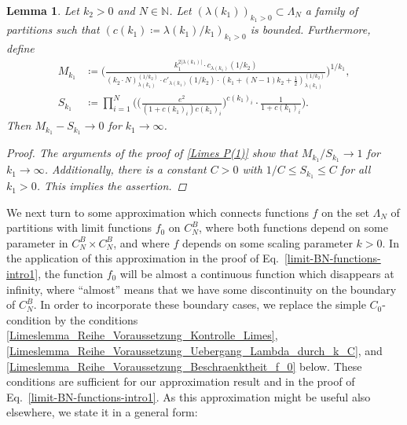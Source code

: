 \documentclass[reqno]{amsart}
\theoremstyle{plain}
\newtheorem{lemma}[theorem]{Lemma}
\theoremstyle{definition}
\numberwithin{equation}{section}
\newcommand{\N}{\mathbb{N}}
\newcommand{\ra}{\rightarrow}
\begin{document}
\begin{lemma}\label{Limes_1_ohne_Jackpolynomanteil}
Let $k_2>0$ and $N\in\N$.
Let $(\lambda(k_1))_{k_1 > 0}\subset\Lambda_N$ a family of partitions such that $(c(k_1)\coloneqq \lambda(k_1)/k_1)_{k_1>0}$ is bounded. 
Furthermore, define
\begin{align*}
M_{k_1} &\coloneqq \Bigg( \frac{k_1^{2|\lambda(k_1)|} \cdot c_{\lambda(k_1)}(1/k_2)}{(k_2 \cdot N)_{\lambda(k_1)}^{(1/k_2)} \cdot c'_{\lambda(k_1)}(1/k_2) \cdot (k_1 + (N-1)k_2 + \frac{1}{2})_{\lambda(k_1)}^{(1/k_2)}} \Bigg)^{1/k_1}, \\
S_{k_1} &\coloneqq \prod\limits_{i=1}^N \Bigg( \bigg( \frac{e^2}{(1+c(k_1)_i)c(k_1)_i} \bigg)^{c(k_1)_i} \cdot \frac{1}{1+c(k_1)_i} \Bigg).
\end{align*}
Then $M_{k_1}-S_{k_1} \ra 0$ for $k_1 \to \infty$.

\begin{proof}
The arguments of  the proof of \eqref{Limes P(1)} show that $M_{k_1}/S_{k_1} \ra 1$ for $k_1 \to \infty$. 
Additionally, there is a constant $C>0$ with $1/C \leq S_{k_1} \leq C$ for all $k_1>0$.
This implies the assertion.
\end{proof}
\end{lemma}



We next turn to some approximation which connects functions $f$ on the set  $\Lambda_N$ of partitions with limit functions
$f_0$ on $C_N^B$, where both functions depend on some  parameter in $C_N^B\times C_N^B$, and
where $f$  depends on some scaling parameter $k>0$. In the application of this approximation in the proof of
Eq.~\eqref{limit-BN-functions-intro1}, the function $f_0$ will be almost a continuous function which disappears at infinity, where
``almost'' means that we have some discontinuity on the boundary of $ C_N^B$. In order to incorporate
these boundary cases, we replace the simple $C_0$-condition by the conditions  \eqref{Limeslemma_Reihe_Voraussetzung_Kontrolle_Limes},
\eqref{Limeslemma_Reihe_Voraussetzung_Uebergang_Lambda_durch_k_C}, and \eqref{Limeslemma_Reihe_Voraussetzung_Beschraenktheit_f_0} below.
These  conditions are sufficient for our approximation result and
in the proof of
Eq.~\eqref{limit-BN-functions-intro1}.
As this approximation might be useful also elsewhere, we state it in a  general form: 
\end{document}
